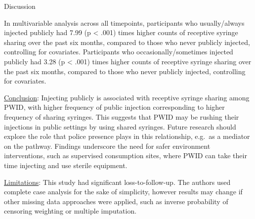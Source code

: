 \documentclass[ignorenonframetext,]{beamer}
\begin{document}
\begin{frame}{Discussion}

In multivariable analysis across all timepoints, participants who
usually/always injected publicly had 7.99 (p \textless{} .001) times
higher counts of receptive syringe sharing over the past six months,
compared to those who never publicly injected, controlling for
covariates. Participants who occasionally/sometimes injected publicly
had 3.28 (p \textless{} .001) times higher counts of receptive syringe
sharing over the past six months, compared to those who never publicly
injected, controlling for covariates.

\underline{Conclusion}: Injecting publicly is associated with receptive
syringe sharing among PWID, with higher frequency of public injection
corresponding to higher frequency of sharing syringes. This suggests
that PWID may be rushing their injections in public settings by using
shared syringes. Future research should explore the role that police
presence plays in this relationship, e.g.~as a mediator on the pathway.
Findings underscore the need for safer environment interventions, such
as supervised consumption sites, where PWID can take their time
injecting and use sterile equipment.

\underline{Limitations}: This study had significant loss-to-follow-up.
The authors used complete case analysis for the sake of simplicity,
however results may change if other missing data approaches were
applied, such as inverse probability of censoring weighting or multiple
imputation.

\end{frame}
\end{document}
